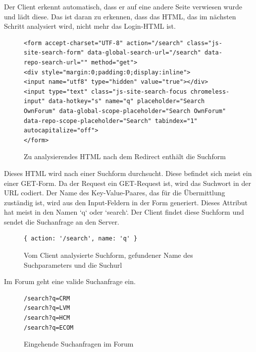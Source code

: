 Der Client erkennt automatisch, dass er auf eine andere Seite verwiesen wurde und lädt diese. Das ist daran zu erkennen, dass das HTML, das im nächsten Schritt analysiert wird, nicht mehr das Login-HTML ist.

\begin{figure}[h!]
\begin{lstlisting}[language=HTML5]
<form accept-charset="UTF-8" action="/search" class="js-site-search-form" data-global-search-url="/search" data-repo-search-url="" method="get">
<div style="margin:0;padding:0;display:inline">
<input name="utf8" type="hidden" value="true"></div>
<input type="text" class="js-site-search-focus chromeless-input" data-hotkey="s" name="q" placeholder="Search OwnForum" data-global-scope-placeholder="Search OwnForum" data-repo-scope-placeholder="Search" tabindex="1" autocapitalize="off">
</form>
\end{lstlisting}
\caption{Zu analysierendes HTML nach dem Redirect enthält die Suchform}
\end{figure}

Dieses HTML wird nach einer Suchform durchsucht. Diese befindet sich meist ein einer GET-Form. Da der Request ein GET-Request ist, wird das Suchwort in der URL codiert. Der Name des Key-Value-Paares, das für die Übermittlung zuständig ist, wird aus den Input-Feldern in der Form generiert. Dieses Attribut hat meist in den Namen `q` oder `search`. Der Client findet diese Suchform und sendet die Suchanfrage an den Server.


\begin{figure}[ht]
\begin{lstlisting}[language=HTML5]
{ action: '/search', name: 'q' }
\end{lstlisting}
\caption{Vom Client analysierte Suchform, gefundener Name des Suchparameters und die Suchurl}
\end{figure}

Im Forum geht eine valide Suchanfrage ein.


\begin{figure}[ht]
\begin{lstlisting}[language=HTML5]
/search?q=CRM
/search?q=LVM
/search?q=HCM
/search?q=ECOM
\end{lstlisting}
\caption{Eingehende Suchanfragen im Forum }
\end{figure}

